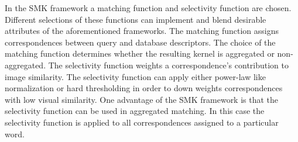 





        In the SMK framework a matching function and selectivity function are chosen. Different selections of these
        functions can implement and blend desirable attributes of the aforementioned frameworks. The matching
        function assigns correspondences between query and database descriptors. The choice of the matching
        function determines whether the resulting kernel is aggregated or non-aggregated. The selectivity function
        weights a correspondence's contribution to image similarity. The selectivity function can apply either
        power-law like normalization or hard thresholding in order to down weights correspondences with low visual
        similarity. One advantage of the SMK framework is that the selectivity function can be used in aggregated
        matching. In this case the selectivity function is applied to all correspondences assigned to a particular
        word.

